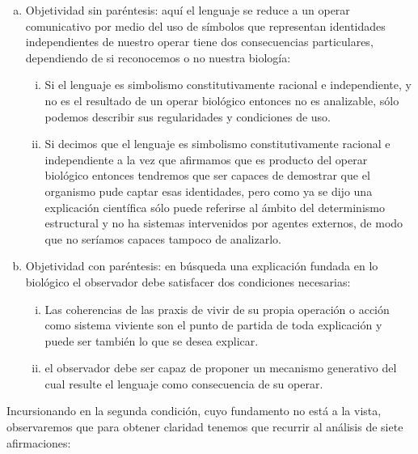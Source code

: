 \documentclass[10pt]{article}
\begin{document}
        \begin{enumerate}[a.]
            \item  Objetividad sin paréntesis: aquí el lenguaje se reduce a un operar comunicativo por medio del uso de símbolos que representan identidades independientes de nuestro operar tiene dos consecuencias particulares, dependiendo de si reconocemos o no nuestra biología:
            
            \begin{enumerate}[i.]
                \item  Si el lenguaje es simbolismo constitutivamente racional e independiente, y no es el resultado de un operar biológico entonces no es analizable, sólo podemos describir sus regularidades y condiciones de uso.
                \item Si decimos que el lenguaje es simbolismo constitutivamente racional e independiente a la vez que afirmamos que es producto del operar biológico entonces tendremos que ser capaces de demostrar que el organismo pude captar esas identidades, pero como ya se dijo una explicación científica sólo puede referirse al ámbito del determinismo estructural y no ha sistemas intervenidos por agentes externos, de modo que no seríamos capaces tampoco de analizarlo.
            \end{enumerate}

            \item Objetividad con paréntesis: en búsqueda una explicación fundada en lo biológico el observador debe satisfacer dos condiciones necesarias:
            
            \begin{enumerate}[i.]
                \item Las coherencias de las praxis de vivir de su propia operación o acción como sistema viviente son el punto de partida de toda explicación y puede ser también lo que se desea explicar.
                \item el observador debe ser capaz de proponer un mecanismo generativo del cual resulte el lenguaje como consecuencia de su operar.
            \end{enumerate}
        \end{enumerate}
       
        
        Incursionando en la segunda condición, cuyo fundamento no está a la vista, observaremos que para obtener claridad tenemos que recurrir al análisis de siete afirmaciones:
\end{document}
